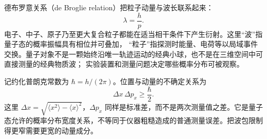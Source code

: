 德布罗意关系（de Broglie relation）把粒子动量与波长联系起来：
\begin{equation}
 \lambda=\frac hp.
\end{equation}
电子、中子、原子乃至更大复合粒子都能在适当相干条件下产生衍射。这里“波”指量子态的概率振幅具有相位并可叠加，
“粒子”指探测时能量、电荷等以局域事件交换。量子对象不是一颗始终沿唯一轨迹运动的经典小球，也不是在三维空间中可直接测量的经典物质波；
实验装置和测量问题决定哪些概率分布可被观察。

记约化普朗克常数为 $\hbar=h/(2\pi)$。位置与动量的不确定关系为
\begin{equation}
 \Delta x\,\Delta p_x\ge\frac\hbar2.
\end{equation}
这里 $\Delta x=\sqrt{\langle x^2\rangle-\langle x\rangle^2}$，$\Delta p_x$ 同样是标准差，而不是两次测量值之差。它是量子态允许的概率分布宽度关系，不等同于仪器粗糙造成的普通测量误差。把波包限制得更窄需要更宽的动量成分。

